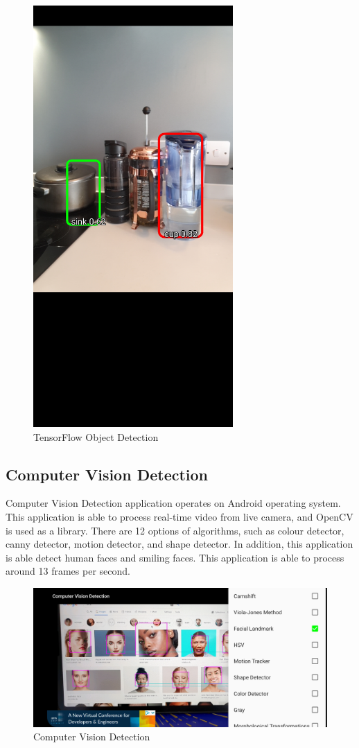             \begin{figure}[!ht]
                \centering
                \includegraphics[width=3in]{images/chapter2/ml-detection-tf.jpg}
                \caption{TensorFlow Object Detection}
                \label{ts-obj-detection}
            \end{figure}

        \subsection{Computer Vision Detection}
            Computer Vision Detection application operates on Android operating system.
            This application is able to process real-time video from live camera,
            and OpenCV is used as a library.
            There are 12 options of algorithms, such as colour detector, canny detector, motion detector, and shape detector.
            In addition, this application is able detect human faces and smiling faces.
            This application is able to process around 13 frames per second.

            \begin{figure}[!ht]
                \centering
                \includegraphics[width=5in]{images/chapter2/cv-detection.jpg}
                \caption{Computer Vision Detection}
                \label{cv-detection}
            \end{figure}
